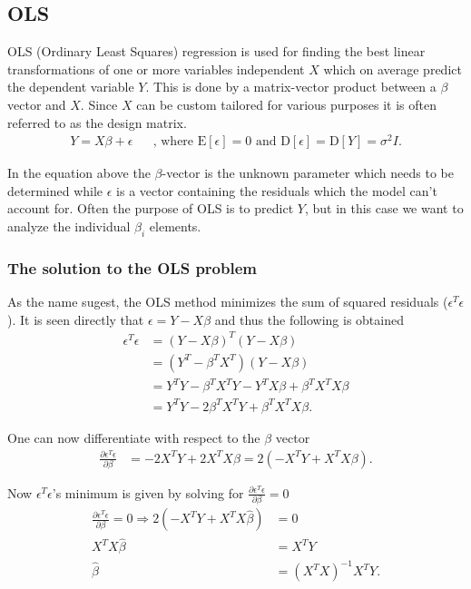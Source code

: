 \subsection{OLS}
OLS (Ordinary Least Squares) regression is used for finding the best linear transformations of one or more variables independent $X$ which on average predict the dependent variable $Y$. 
This is done by a matrix-vector product between a $\beta$ vector and $X$.
Since $X$ can be custom tailored for various purposes it is often referred to as the design matrix.
\begin{align}
Y=X \beta +\epsilon && \text{, where } \mathrm{E}[\epsilon] = 0 \text{ and } \mathrm{D}[\epsilon] = \mathrm{D}[Y] = \sigma^2 I .
\end{align}

In the equation above the $\beta$-vector is the unknown parameter which needs to be determined while  $\epsilon$ is a vector containing the residuals which the model can't account for.
Often the purpose of OLS is to predict $Y$, but in this case we want to analyze the individual $\beta_i$ elements.

\subsubsection{The solution to the OLS problem}
As the name sugest, the OLS method minimizes the sum of squared residuals ($\epsilon^T \epsilon$).
It is seen directly that $\epsilon = Y - X \beta$ and thus the following is obtained
\begin{equation}
\begin{split}
\epsilon^T\epsilon&=(Y-X\beta)^T (Y-X\beta)\\
&=(Y^T-\beta^T X^T) (Y-X\beta) \\
&=Y^T Y-\beta^T X^T Y-Y^T X \beta + \beta^T X^T X \beta \\
&=Y^T Y- 2\beta^T X^T Y+ \beta^T X^T X \beta.
\end{split}
\end{equation}

One can now differentiate with respect to the $\beta$ vector
\begin{equation}
\begin{split}
\frac{\partial \epsilon^T\epsilon}{\partial \beta}&=-2 X^T Y+2X^T X \beta=2(-X^T Y+X^T X \beta).
\end{split}
\end{equation}

Now  $\epsilon^T \epsilon$'s minimum is given by solving for $\frac{\partial \epsilon^T\epsilon}{\partial \beta} = 0$
\begin{equation}
\begin{split}
\frac{\partial \epsilon^T\epsilon}{\partial \beta} = 0 \Rightarrow 2(-X^T Y+X^T X \hat{\beta}) &= 0 \\
X^T X \hat{\beta}&=X^T Y \\
\hat{\beta}&=(X^T X)^{-1} X^T Y.
\end{split}
\end{equation}

